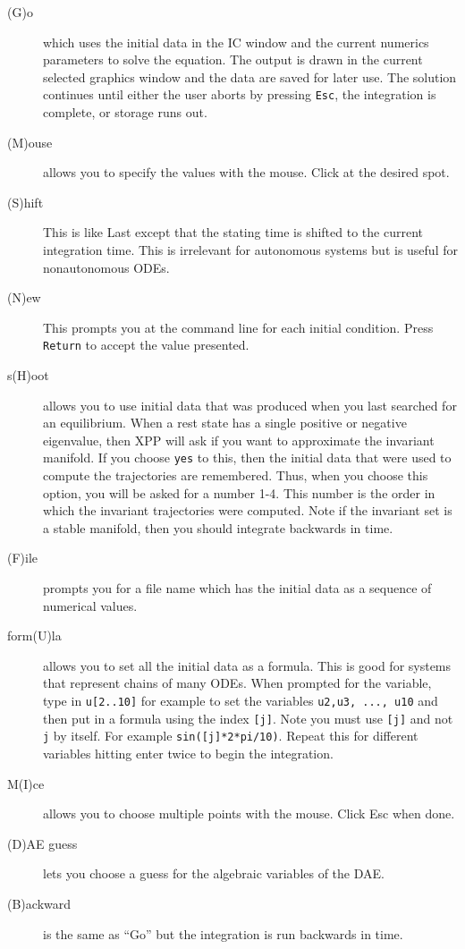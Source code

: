 \documentclass{article}
\begin{document}
\begin{description}
\begin{description}
\item[(G)o] which uses the initial data in the IC window and the current
 numerics parameters to solve the equation.  The output is drawn in the
 current selected graphics window and the data are saved for later use.  The
 solution continues until either the user aborts by pressing {\tt Esc}, the
 integration is complete, or storage runs out.
\item[(M)ouse]  allows you to specify the values with the mouse.  Click at the
 desired spot.
\item[(S)hift] This is like Last except that the stating time is shifted to the
current integration time.  This is irrelevant for autonomous systems but is
 useful for nonautonomous ODEs.
\item[(N)ew] This prompts you at the command line for each initial condition.
 Press {\tt Return} to accept the value presented.
\item[s(H)oot] allows you to use initial data that was produced when
you last searched for an equilibrium.  When a rest state has a single
positive or negative eigenvalue, then XPP will ask if you want to
approximate the invariant manifold.  If you choose {\tt yes} to this,
then the initial data that were used to compute the trajectories are
remembered.  Thus, when you choose this option, you will be asked for
a number 1-4.  This number is the order in which the invariant
trajectories were computed.  Note if the invariant set is a stable
manifold, then you should integrate backwards in time.
\item[(F)ile] prompts you for a file name which has the initial data
as a sequence of numerical values.
\item[form(U)la] allows you to set all the initial data as a
formula. This is good for systems that represent chains of many ODEs.
When prompted for the variable, type in {\tt u[2..10]} for example to
set the variables {\tt u2,u3, ..., u10} and then put in a formula
using the index {\tt [j]}. Note you must use {\tt [j]} and not {\tt j}
by itself. For example {\tt sin([j]*2*pi/10)}. Repeat this for
different variables hitting enter twice to begin the integration.
\item[M(I)ce] allows you to choose multiple points with the
mouse. Click Esc when done.
\item[(D)AE guess] lets you choose a guess for the algebraic variables of
the DAE.
\item[(B)ackward] is the same as ``Go'' but the integration is run
backwards in time.


\end{description}
\end{description}
\end{document}
